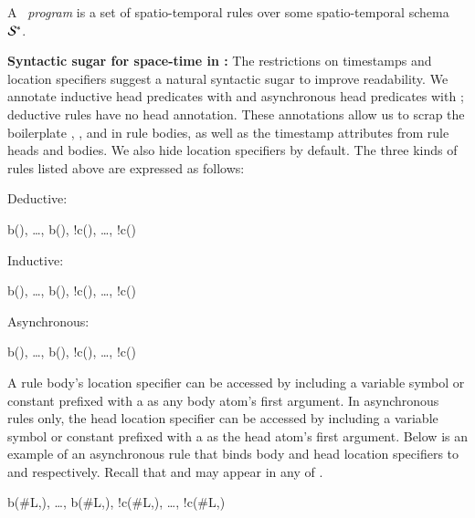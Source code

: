 A \lang\ {\em program} is a set of spatio-temporal rules over some spatio-temporal schema $\stschema$.  

\noindent
\textbf{Syntactic sugar for space-time in \lang:}
The restrictions on timestamps and location specifiers suggest a natural syntactic sugar to improve readability.  We annotate inductive head predicates with  and asynchronous head predicates with ; deductive rules have no head annotation.  These annotations allow us to scrap the boilerplate , ,  and  in rule bodies, as well as the timestamp attributes from rule heads and bodies.  We also hide location specifiers by default. The three kinds of rules listed above are expressed as follows:

Deductive:

\begin{Drules}
        {b(), \ldots, b(), !c(), \ldots, !c()}
\end{Drules}

Inductive:

\begin{Drules}
        {b(), \ldots, b(), !c(), \ldots, !c()}
\end{Drules}

Asynchronous:

\begin{Drules}
        {b(), \ldots, b(), !c(), \ldots, !c()}
\end{Drules}

A rule body's location specifier can be accessed by including a variable symbol or constant prefixed with a \dedalus{#} as any body atom's first argument.  In asynchronous rules only, the head location specifier can be accessed by including a variable symbol or constant prefixed with a \dedalus{#} as the head atom's first argument.  Below is an example of an asynchronous rule that binds body and head location specifiers to  and  respectively.  Recall that  and  may appear in any of .

\begin{Drules}
        {b(#L,), \ldots, b(#L,), !c(#L,), \ldots, !c(#L,)}
\end{Drules}

